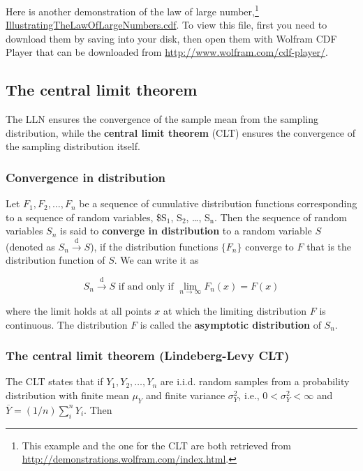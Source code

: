 \documentclass[a4paper,11pt]{article}
\begin{document}
Here is another demonstration of the law of large number,\footnote{This example and the one for the CLT are both retrieved from
\url{http://demonstrations.wolfram.com/index.html}.}
\url{IllustratingTheLawOfLargeNumbers.cdf}. To view this file,
first you need to download them by saving into your disk, then open
them with Wolfram CDF Player that can be downloaded from
\url{http://www.wolfram.com/cdf-player/}.

\subsection{The central limit theorem}
\label{sec:org91f7b76}

The LLN ensures the convergence of the sample mean from the sampling
distribution, while the \textbf{central limit theorem} (CLT) ensures the
convergence of the sampling distribution itself. 

\subsubsection*{Convergence in distribution}
\label{sec:org37e56f6}

Let \(F_1, F_2, \ldots, F_n\) be a sequence of cumulative distribution
functions corresponding to a sequence of random variables, \$S\(_{\text{1}}\), S\(_{\text{2}}\),
\ldots, S\(_{\text{n}}\). Then the sequence of random variables \({S_n}\) is said to
\textbf{converge in distribution} to a random variable \(S\) (denoted as \(S_n
\xrightarrow{\text{d}} S\)), if the distribution functions \(\{F_n\}\)
converge to \(F\) that is the distribution function of \(S\). We can write
it as

\[ S_n \xrightarrow{\text{d}} S \text{ if and only if } \lim_{n
\rightarrow \infty}F_n(x)=F(x) \]

where the limit holds at all points \(x\) at which the limiting
distribution \(F\) is continuous. The distribution \(F\) is called the
\textbf{asymptotic distribution} of \(S_n\).

\subsubsection*{The central limit theorem (Lindeberg-Levy CLT)}
\label{sec:org1fe77a5}

The CLT states that if \(Y_1, Y_2, \ldots, Y_n\) are i.i.d. random samples from a
probability distribution with finite mean \(\mu_Y\) and finite variance
\(\sigma^2_Y\), i.e., \(0 < \sigma^2_Y < \infty\) and \(\overline{Y} =
(1/n)\sum_i^nY_i\). Then
\end{document}
